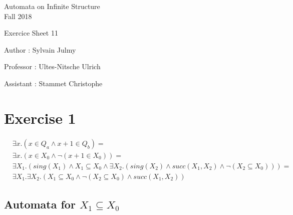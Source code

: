 \documentclass[a4paper,11pt]{report}
\author{Sylvain Julmy}
\date{\today}
\begin{document}
\begin{center}
  \Large{
    Automata on Infinite Structure\\
    Fall 2018
  }
  
  \noindent\makebox[\linewidth]{\rule{\linewidth}{0.4pt}}
  Exercice Sheet 11

  \vspace*{1cm}

  Author : Sylvain Julmy
  \noindent\makebox[\linewidth]{\rule{\linewidth}{0.4pt}}

  \begin{flushleft}
    Professor : Ultes-Nitsche Ulrich
    
    Assistant : Stammet Christophe
  \end{flushleft}

  \noindent\makebox[\linewidth]{\rule{\textwidth}{1pt}}
\end{center}

\section*{Exercise 1}

\begin{align*}
  & \exists x. (x \in Q_a \wedge x + 1 \in Q_b ) = \\
  & \exists x. (x \in X_0 \wedge \neg (x + 1 \in X_0) ) = \\
  & \exists X_1.( sing(X_1) \wedge X_1 \subseteq X_0 \wedge
    \exists X_2.( sing(X_2) \wedge succ(X_1,X_2) \wedge \neg (X_2 \subseteq X_0) ) ) = \\
  &  \exists X_1.\exists X_2.(X_1 \subseteq X_0 \wedge \neg(X_2 \subseteq X_0) \wedge succ(X_1,X_2))
\end{align*}


\subsection*{Automata for $X_1 \subseteq X_0$}

\begin{center}
\end{center}
\end{document}
